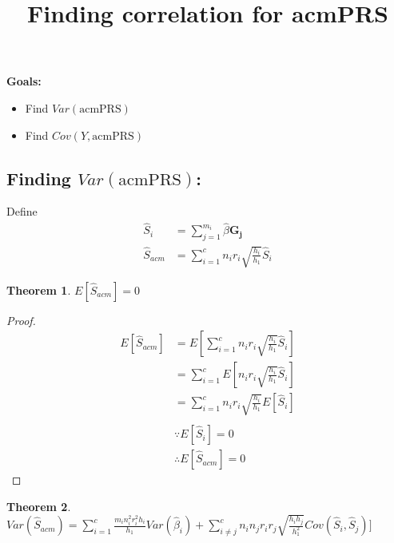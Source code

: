 \documentclass{article}
\newtheorem{theorem}{Theorem}
\begin{document}
\title{Finding correlation for acmPRS}

\maketitle

\textbf{Goals:}

\begin{itemize}
	\item Find $Var(\text{acmPRS})$
	\item Find $Cov(Y, \text{acmPRS})$
\end{itemize}

\subsection{Finding $Var(\text{acmPRS})$:}

Define 
$$ 
\begin{aligned} 
\hat{S}_i &= \sum^{m_i}_{j = 1} \hat{\beta} \mathbf{G_j} \\
\hat{S}_{acm} &= \sum^c_{i=1} n_i r_i \sqrt{\frac{h_i}{h_1}} \hat{S}_i 
\end{aligned} 
$$



\begin{theorem}
$E[\hat{S}_{acm}] = 0$ 
\end{theorem}

\begin{proof}
$$ 
\begin{aligned}
E[\hat{S}_{acm}] &= E[\sum^c_{i=1} n_i r_i \sqrt{\frac{h_i}{h_1}} \hat{S}_i] \\
&= \sum^c_{i=1} E[n_i r_i \sqrt{\frac{h_i}{h_1}} \hat{S}_i] \\
&= \sum^c_{i=1} n_i r_i \sqrt{\frac{h_i}{h_1}} E[\hat{S}_i] \\ \\
&\because E[\hat{S}_i] = 0 \\
&\therefore E[\hat{S}_{acm}] = 0
\end{aligned}
$$
\end{proof}

\newpage

\begin{theorem}
$Var(\hat{S}_{acm}) =\sum^c_{i=1}  \frac{m_i n^2_i r^2_i h_i}{h_1}  Var(\hat{\beta}_i) +  \sum^c_{i \neq j} n_i n_j r_i r_j \sqrt{\frac{h_i h_j}{h^2_1}} Cov(\hat{S}_i, \hat{S}_j)]$
\end{theorem}
\end{document}
